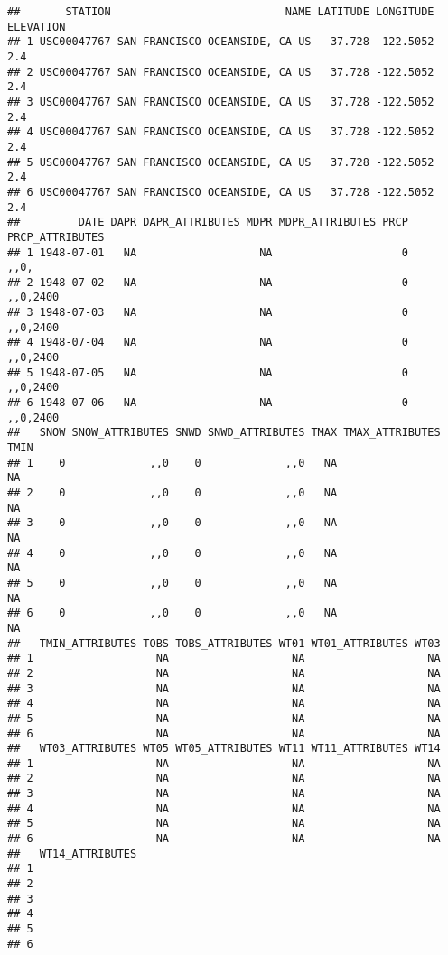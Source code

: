 \documentclass[
]{article}
\begin{document}
\begin{verbatim}
##       STATION                           NAME LATITUDE LONGITUDE ELEVATION
## 1 USC00047767 SAN FRANCISCO OCEANSIDE, CA US   37.728 -122.5052       2.4
## 2 USC00047767 SAN FRANCISCO OCEANSIDE, CA US   37.728 -122.5052       2.4
## 3 USC00047767 SAN FRANCISCO OCEANSIDE, CA US   37.728 -122.5052       2.4
## 4 USC00047767 SAN FRANCISCO OCEANSIDE, CA US   37.728 -122.5052       2.4
## 5 USC00047767 SAN FRANCISCO OCEANSIDE, CA US   37.728 -122.5052       2.4
## 6 USC00047767 SAN FRANCISCO OCEANSIDE, CA US   37.728 -122.5052       2.4
##         DATE DAPR DAPR_ATTRIBUTES MDPR MDPR_ATTRIBUTES PRCP PRCP_ATTRIBUTES
## 1 1948-07-01   NA                   NA                    0            ,,0,
## 2 1948-07-02   NA                   NA                    0        ,,0,2400
## 3 1948-07-03   NA                   NA                    0        ,,0,2400
## 4 1948-07-04   NA                   NA                    0        ,,0,2400
## 5 1948-07-05   NA                   NA                    0        ,,0,2400
## 6 1948-07-06   NA                   NA                    0        ,,0,2400
##   SNOW SNOW_ATTRIBUTES SNWD SNWD_ATTRIBUTES TMAX TMAX_ATTRIBUTES TMIN
## 1    0             ,,0    0             ,,0   NA                   NA
## 2    0             ,,0    0             ,,0   NA                   NA
## 3    0             ,,0    0             ,,0   NA                   NA
## 4    0             ,,0    0             ,,0   NA                   NA
## 5    0             ,,0    0             ,,0   NA                   NA
## 6    0             ,,0    0             ,,0   NA                   NA
##   TMIN_ATTRIBUTES TOBS TOBS_ATTRIBUTES WT01 WT01_ATTRIBUTES WT03
## 1                   NA                   NA                   NA
## 2                   NA                   NA                   NA
## 3                   NA                   NA                   NA
## 4                   NA                   NA                   NA
## 5                   NA                   NA                   NA
## 6                   NA                   NA                   NA
##   WT03_ATTRIBUTES WT05 WT05_ATTRIBUTES WT11 WT11_ATTRIBUTES WT14
## 1                   NA                   NA                   NA
## 2                   NA                   NA                   NA
## 3                   NA                   NA                   NA
## 4                   NA                   NA                   NA
## 5                   NA                   NA                   NA
## 6                   NA                   NA                   NA
##   WT14_ATTRIBUTES
## 1                
## 2                
## 3                
## 4                
## 5                
## 6
\end{verbatim}
\end{document}

